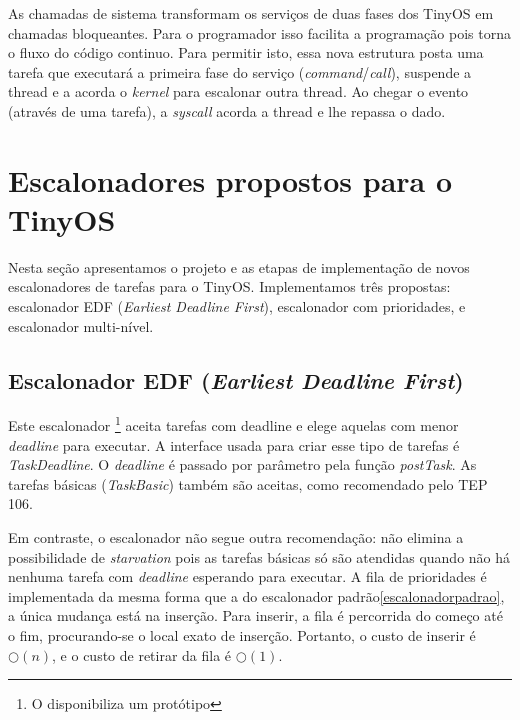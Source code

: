 \documentclass[a4paper, 10pt]{article}
\begin{document}
As chamadas de sistema transformam os serviços de duas fases dos TinyOS em chamadas bloqueantes. Para o programador isso
facilita a programação pois torna o fluxo do código continuo. Para permitir isto, essa nova estrutura posta uma tarefa
que executará a primeira fase do serviço (\textit{command}/\textit{call}), suspende a thread e a acorda o
\textit{kernel} para escalonar outra thread. Ao chegar o evento (através de uma tarefa), a \textit{syscall} acorda a thread e lhe repassa o dado.

\section{Escalonadores propostos para o TinyOS}\label{escalonadorespropostos}
Nesta seção apresentamos o projeto e as etapas de implementação de novos escalonadores
de tarefas para o TinyOS.
Implementamos três propostas: escalonador EDF (\textit{Earliest Deadline First}), escalonador com prioridades,  
e escalonador multi-nível.

\subsection{Escalonador EDF (\textit{Earliest Deadline First})}\label{escalonadoredf}
Este escalonador \footnote{O \cite{TEP106} disponibiliza um protótipo} aceita tarefas com deadline e 
elege aquelas com menor \textit{deadline} para executar. A interface usada para criar
esse tipo de tarefas é \textit{TaskDeadline}. O \textit{deadline} é passado por parâmetro pela função \textit{postTask}.
As tarefas básicas (\textit{TaskBasic}) também são aceitas, como recomendado pelo TEP 106\cite{TEP106}.

Em contraste, o escalonador não segue outra recomendação: não elimina a possibilidade de 
\textit{starvation} pois as tarefas
básicas só são atendidas quando não há nenhuma tarefa com \textit{deadline} esperando para executar. 
A fila de prioridades é implementada da mesma forma que a do escalonador 
padrão\ref{escalonadorpadrao}, a única mudança está na inserção. Para
inserir, a fila é percorrida do começo até o fim, procurando-se o local exato de inserção.
Portanto, o custo de inserir é $\bigcirc(n)$, e o custo de retirar da fila é $\bigcirc(1)$. 
\end{document}
